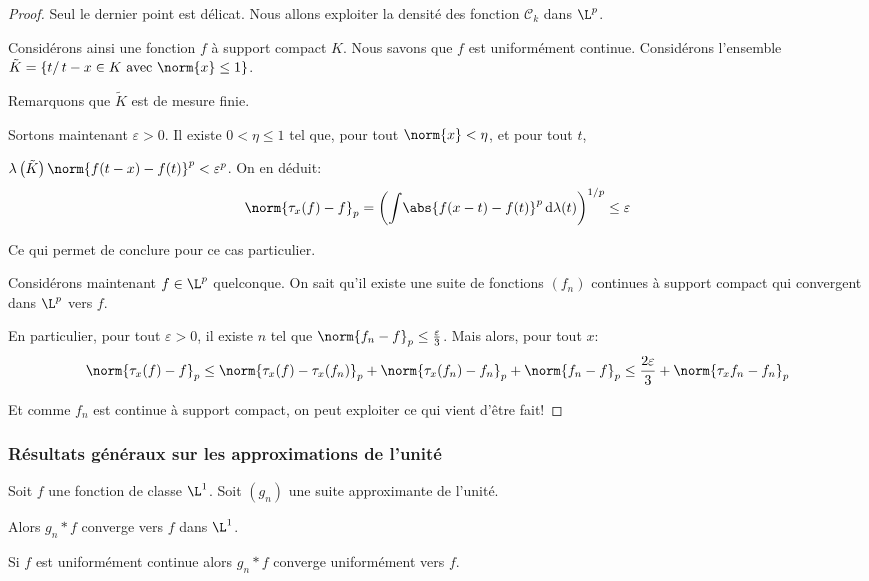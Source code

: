 \begin{proof}
Seul le dernier point est délicat. Nous allons exploiter la densité des fonction $\mathcal{C}_k$ dans $\L^p$. 

\medskip
Considérons ainsi une fonction $f$ à support compact $K$. Nous savons que $f$ est uniformément continue. Considérons l'ensemble $\tilde{K} = \left \{t/ \, t-x \in K \text{ avec } \norm{x} \leq 1 \right \}$. 

Remarquons que $\tilde{K}$ est de mesure finie. 

Sortons maintenant $\varepsilon>0$. Il existe $0 < \eta \leq 1$ tel que, pour tout $\norm{x} < \eta$, et pour tout $t$, 

$\lambda\left ( \tilde{K}\right ) \norm{f(t-x) - f(t)}^p < \varepsilon^p$. On en déduit:
\[
\norm{\tau_x(f) - f}_p = \left ( \displaystyle{\int} \abs{f(x-t) - f(t) }^p \, \mathrm d \lambda(t) \right )^{1/p}  \leq \varepsilon
\]

Ce qui permet de conclure pour ce cas particulier.

\medskip
Considérons maintenant $f \in \L^p$ quelconque. On sait qu'il existe une suite de fonctions $(f_n)$ continues à support compact qui convergent dans $\L^p$ vers $f$. 

En particulier, pour tout $\varepsilon>0$, il existe $n$ tel que $\norm{f_n-f}_p \leq \frac{\varepsilon}{3}$. Mais alors, pour tout $x$:
\[
\norm{\tau_x(f) - f}_p \leq \norm{\tau_x(f) - \tau_x(f_n)}_p + \norm{\tau_x(f_n) - f_n}_p + \norm{f_n - f}_p \leq \frac{2\varepsilon}{3} + \norm{\tau_x{f_n} - f_n}_p
\]

Et comme $f_n$ est continue à support compact, on peut exploiter ce qui vient d'être fait!
\end{proof}

\subsubsection{Résultats généraux sur les approximations de l'unité}

\begin{prop}
Soit $f$ une fonction de classe $\L^1$. Soit $(g_n)$ une suite approximante de l'unité.

\medskip
Alors $g_n * f$ converge vers $f$ dans $\L^1$.

\medskip
Si $f$ est uniformément continue alors $g_n * f$ converge uniformément vers $f$.
\end{prop}

